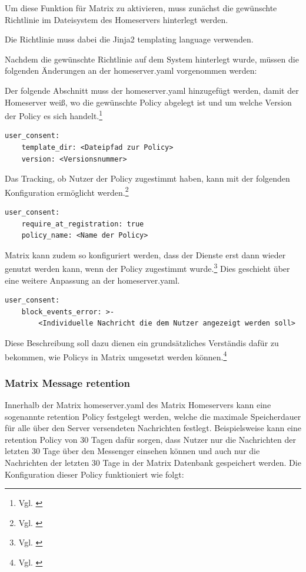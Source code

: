 Um diese Funktion für Matrix zu aktivieren, muss zunächst die gewünschte Richtlinie im Dateisystem des Homeservers hinterlegt werden.

Die Richtlinie muss dabei die Jinja2 templating language verwenden.

Nachdem die gewünschte Richtlinie auf dem System hinterlegt wurde, müssen die folgenden Änderungen an der homeserver.yaml vorgenommen werden:

Der folgende Abschnitt muss der homeserver.yaml hinzugefügt werden, damit der Homeserver weiß, wo die gewünschte Policy abgelegt ist und um welche Version der Policy es sich handelt.\footnote{Vgl. \cite{Matrix.org-custom-policies2020}}

\begin{lstlisting}
user_consent:
    template_dir: <Dateipfad zur Policy>
    version: <Versionsnummer>
\end{lstlisting}

Das Tracking, ob Nutzer der Policy zugestimmt haben, kann mit der folgenden Konfiguration ermöglicht werden.\footnote{Vgl. \cite{Matrix.org-custom-policies2020}}

\begin{lstlisting}
user_consent:
    require_at_registration: true
    policy_name: <Name der Policy>
\end{lstlisting}

Matrix kann zudem so konfiguriert werden, dass der Dienste erst dann wieder genutzt werden kann, wenn der Policy zugestimmt wurde.\footnote{Vgl. \cite{Matrix.org-custom-policies2020}}
Dies geschieht über eine weitere Anpassung an der homeserver.yaml.

\begin{lstlisting}
user_consent:
    block_events_error: >-
        <Individuelle Nachricht die dem Nutzer angezeigt werden soll>
\end{lstlisting}

Diese Beschreibung soll dazu dienen ein grundsätzliches Verständis dafür zu bekommen, wie Policys in Matrix umgesetzt werden können.\footnote{Vgl. \cite{Matrix.org-custom-policies2020}}

\subsubsection{Matrix Message retention}\label{chapter:vdmf}
Innerhalb der Matrix homeserver.yaml des Matrix Homeservers kann eine sogenannte retention Policy festgelegt werden, welche die maximale Speicherdauer für alle über den Server versendeten Nachrichten festlegt. Beispielsweise kann eine retention Policy von 30 Tagen dafür sorgen, dass Nutzer nur die Nachrichten der letzten 30 Tage über den Messenger einsehen können und auch nur die Nachrichten der letzten 30 Tage in der Matrix Datenbank gespeichert werden. Die Konfiguration dieser Policy funktioniert wie folgt:

